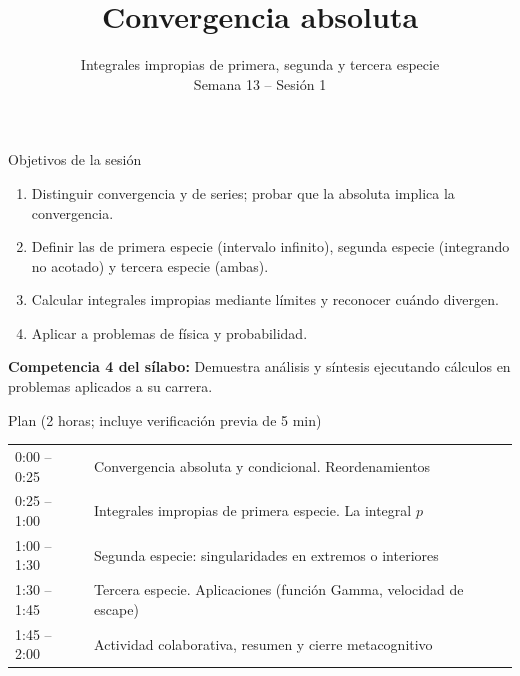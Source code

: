 \documentclass[10pt,aspectratio=169]{beamer}
\title[Convergencia absoluta e impropias]{Convergencia absoluta}
\subtitle{Integrales impropias de primera, segunda y tercera especie\\[2pt]\small Semana 13 -- Sesión 1}
\begin{document}
\begin{frame}
  \titlepage
\end{frame}

\begin{frame}{Objetivos de la sesión}
  \begin{enumerate}
    \item Distinguir convergencia  y  de series; probar que la absoluta implica la convergencia.
    \item Definir las  de primera especie (intervalo infinito), segunda especie (integrando no acotado)
      y tercera especie (ambas).
    \item Calcular integrales impropias mediante límites y reconocer cuándo divergen.
    \item Aplicar a problemas de física y probabilidad.
  \end{enumerate}
  \vspace{1mm}
  {\small\textbf{Competencia 4 del sílabo:} Demuestra análisis y síntesis ejecutando cálculos en problemas aplicados a su carrera.}
  \begin{block}{Plan (2 horas; incluye verificación previa de 5 min)}
    \begin{tabular}{ll}
      0:00 -- 0:25 & Convergencia absoluta y condicional. Reordenamientos\\
      0:25 -- 1:00 & Integrales impropias de primera especie. La integral $p$\\
      1:00 -- 1:30 & Segunda especie: singularidades en extremos o interiores\\
      1:30 -- 1:45 & Tercera especie. Aplicaciones (función Gamma, velocidad de escape)\\
      1:45 -- 2:00 & Actividad colaborativa, resumen y cierre metacognitivo
    \end{tabular}
  \end{block}
\end{frame}
\end{document}
